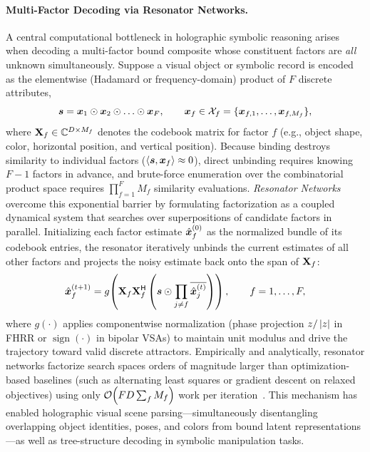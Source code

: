 \paragraph{Multi-Factor Decoding via Resonator Networks.}
A central computational bottleneck in holographic symbolic reasoning arises when decoding a multi-factor bound composite whose constituent factors are \emph{all} unknown simultaneously.
Suppose a visual object or symbolic record is encoded as the elementwise (Hadamard or frequency-domain) product of $F$ discrete attributes,
\begin{equation}\label{eq:multifactor_composite}
    \vect{s} = \vect{x}_1 \hadamard \vect{x}_2 \hadamard \dots \hadamard \vect{x}_F,
    \qquad
    \vect{x}_f \in \mathcal{X}_f = \{\vect{x}_{f,1}, \dots, \vect{x}_{f,M_f}\},
\end{equation}
where $\mathbf{X}_f \in \mathbb{C}^{D \times M_f}$ denotes the codebook matrix for factor $f$ (e.g., object shape, color, horizontal position, and vertical position).
Because binding destroys similarity to individual factors ($\left\langle \boldsymbol{s}, \boldsymbol{x}_f \right\rangle \approx 0$), direct unbinding requires knowing $F - 1$ factors in advance, and brute-force enumeration over the combinatorial product space requires $\prod_{f=1}^F M_f$ similarity evaluations.
\emph{Resonator Networks}~\cite{FRADY_2020_RESONATOR,KENT_2020_RESONATOR} overcome this exponential barrier by formulating factorization as a coupled dynamical system that searches over superpositions of candidate factors in parallel.
Initializing each factor estimate $\hat{\boldsymbol{x}}_f^{(0)}$ as the normalized bundle of its codebook entries, the resonator iteratively unbinds the current estimates of all other factors and projects the noisy estimate back onto the span of $\mathbf{X}_f$:
\begin{equation}\label{eq:resonator_update}
    \hat{\boldsymbol{x}}_f^{(t+1)} = g\!\left(\mathbf{X}_f \mathbf{X}_f^{\mathsf{H}} \left(\boldsymbol{s} \odot \prod_{j \neq f} \overline{\hat{\boldsymbol{x}}_j^{(t)}}\right)\right),
    \qquad f = 1, \dots, F,
\end{equation}
where $g(\cdot)$ applies componentwise normalization (phase projection $z / \left\lvert z \right\rvert$ in FHRR or $\operatorname{sign}(\cdot)$ in bipolar VSAs) to maintain unit modulus and drive the trajectory toward valid discrete attractors.
Empirically and analytically, resonator networks factorize search spaces orders of magnitude larger than optimization-based baselines (such as alternating least squares or gradient descent on relaxed objectives) using only $\mathcal{O}\!\left(F D \sum_f M_f\right)$ work per iteration~\cite{KENT_2020_RESONATOR}.
This mechanism has enabled holographic visual scene parsing---simultaneously disentangling overlapping object identities, poses, and colors from bound latent representations---as well as tree-structure decoding in symbolic manipulation tasks.

